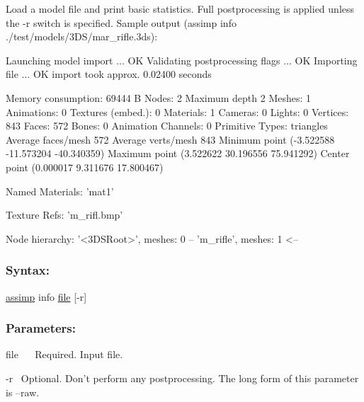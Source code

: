 Load a model file and print basic statistics. Full postprocessing is applied unless the {\ttfamily -\/r} switch is specified. Sample output ({\ttfamily assimp info ./test/models/3\+D\+S/mar\+\_\+rifle.3ds})\+:

\begin{DoxyVerb}Launching model import ...           OK
Validating postprocessing flags ...  OK
Importing file ...                   OK
   import took approx. 0.02400 seconds

Memory consumption: 69444 B
Nodes:              2
Maximum depth       2
Meshes:             1
Animations:         0
Textures (embed.):  0
Materials:          1
Cameras:            0
Lights:             0
Vertices:           843
Faces:              572
Bones:              0
Animation Channels: 0
Primitive Types:    triangles
Average faces/mesh  572
Average verts/mesh  843
Minimum point      (-3.522588 -11.573204 -40.340359)
Maximum point      (3.522622 30.196556 75.941292)
Center point       (0.000017 9.311676 17.800467)

Named Materials:
    'mat1'

Texture Refs:
    'm_rifl.bmp'

Node hierarchy:
'<3DSRoot>', meshes: 0
-- 'm_rifle', meshes: 1
<--
\end{DoxyVerb}


\subsubsection*{Syntax\+:}


\begin{DoxyCode}
\hyperlink{namespaceassimp}{assimp} info \hyperlink{structfile}{file} [-r]
\end{DoxyCode}


\subsubsection*{Parameters\+:}

{\ttfamily  file~\newline
}~\newline
 Required. Input file. 

{\ttfamily  -\/r}~\newline
 Optional. Don't perform any postprocessing. The long form of this parameter is {\ttfamily --raw}. 